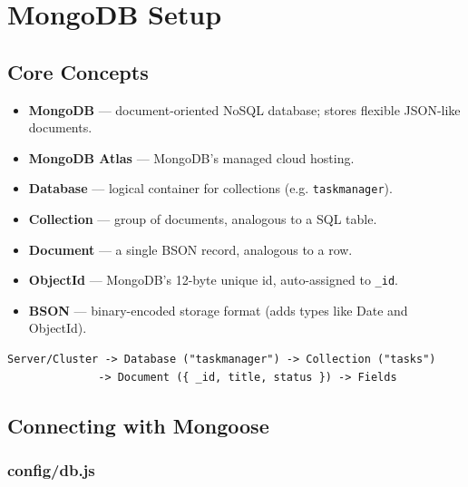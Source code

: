 \chapter{MongoDB Setup}

\section{Core Concepts}

\begin{itemize}
  \item \textbf{MongoDB} --- document-oriented NoSQL database; stores flexible JSON-like documents.
  \item \textbf{MongoDB Atlas} --- MongoDB's managed cloud hosting.
  \item \textbf{Database} --- logical container for collections (e.g. \texttt{taskmanager}).
  \item \textbf{Collection} --- group of documents, analogous to a SQL table.
  \item \textbf{Document} --- a single BSON record, analogous to a row.
  \item \textbf{ObjectId} --- MongoDB's 12-byte unique id, auto-assigned to \texttt{\_id}.
  \item \textbf{BSON} --- binary-encoded storage format (adds types like Date and ObjectId).
\end{itemize}

\begin{diagrambox}
\begin{verbatim}
Server/Cluster -> Database ("taskmanager") -> Collection ("tasks")
              -> Document ({ _id, title, status }) -> Fields
\end{verbatim}
\end{diagrambox}

\section{Connecting with Mongoose}


\subsection{config/db.js}

